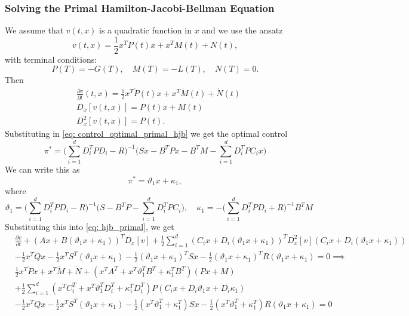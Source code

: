 \subsubsection{Solving the Primal Hamilton-Jacobi-Bellman Equation}
We assume that $v(t,x)$ is a quadratic function in $x$ and we use the ansatz
\begin{equation}
    v(t,x) = \frac12 x^T P(t) x + x^T M(t) + N(t), 
    \label{eq: ansatz_primal_hjb}
\end{equation}
with terminal conditions:
\begin{equation}
    P(T) = -G(T), \quad M(T) = - L(T), \quad N(T) = 0. \label{eq: terminal_conditions_pirmal_hjb}
\end{equation}
Then 
\begin{align*}
    &\frac{\partial v}{\partial t}(t,x) = \frac12 x^T \dot{P}(t) x + x^T \dot{M}(t) + \dot{N}(t)\\
    &D_x[v(t,x)] = P(t) x + M(t)\\
    &D^2_x[v(t,x)] = P(t).
\end{align*}
Substituting in \eqref{eq: control_optimal_primal_hjb} we get the optimal control
\begin{equation*}
    \pi^\ast = \bigg(\sum_{i=1}^d D_i^T P D_i - R\bigg)^{-1} \bigg(S x - B^T P x - B^T M - \sum_{i=1}^d D_i^T P C_i x\bigg)
\end{equation*}
We can write this as 
\begin{equation*}
    \pi^\ast = \vartheta_1 x + \kappa_1,
\end{equation*}
where
\begin{equation}
    \vartheta_1 = \bigg(\sum_{i=1}^d D_i^T P D_i - R\bigg)^{-1} \bigg(S - B^T P - \sum_{i=1}^d D_i^T P C_i \bigg), \quad \kappa_1 = -\bigg(\sum_{i=1}^d D_i^T P D_i + R\bigg)^{-1} B^T M \label{eq: theta_kappa_primal_hjb}
\end{equation}
Substituting this into \eqref{eq: hjb_primal}, we get 
\begin{align*}
    &\frac{\partial v}{\partial t} + (A x + B (\vartheta_1 x + \kappa_1))^T D_x[v] + \frac12 \sum_{i=1}^d (C_i x + D_i (\vartheta_1 x + \kappa_1))^T D_x^2[v](C_i x + D_i (\vartheta_1 x + \kappa_1))\\
    &- \frac12 x^T Q x - \frac12 x^T S^T (\vartheta_1 x + \kappa_1) - \frac12 {(\vartheta_1 x + \kappa_1)}^T S x - \frac12 {(\vartheta_1 x + \kappa_1)}^T R (\vartheta_1 x + \kappa_1) = 0 \implies \\
    &\frac12 x^T \dot{P} x + x^T \dot{M} + \dot{N} + (x^T A^T + x^T \vartheta_1^T B^T + \kappa_1^T B^T)(P x + M)\\
    &+ \frac12 \sum_{i=1}^d (x^T C_i^T + x^T \vartheta_1^T D_i^T + \kappa_1^T D_i^T)P ( C_i x + D_i \vartheta_1 x + D_i \kappa_1)\\
    &- \frac12 x^T Q x - \frac12 x^T S^T (\vartheta_1 x + \kappa_1) - \frac12 {(x^T \vartheta_1^T  + \kappa_1^T)} S x - \frac12 {(x^T \vartheta_1^T + \kappa_1^T)} R (\vartheta_1 x + \kappa_1) = 0
\end{align*}
